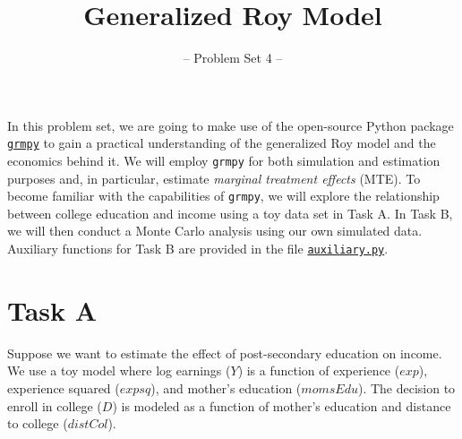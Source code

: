 

\title{Generalized Roy Model}
\subtitle{-- Problem Set 4 --}
\date{}

\maketitle\vspace{-2cm}

In this problem set, we are going to make use of the open-source Python package \href{https://grmpy.readthedocs.io/en/latest/}{\texttt{grmpy}} to gain a practical understanding of the generalized Roy model and the economics behind it. We will employ \texttt{grmpy} for both simulation and estimation purposes and, in particular, estimate \emph{marginal treatment effects} (MTE). To become familiar with the capabilities of {\texttt{grmpy}}, we will explore the relationship between college education and income using a toy data set in Task A. 
In Task B, we will then conduct a Monte Carlo analysis using our own simulated data. Auxiliary functions for Task B are provided in the file \href{https://github.com/HumanCapitalAnalysis/microeconometrics/blob/prset_grmpy/problem-sets/04-generalized-roy-model/sources/auxiliary.py}{\texttt{auxiliary.py}}.

\section*{Task A} 

Suppose we want to estimate the effect of post-secondary education on income. We use a toy model where log earnings ($Y$) is a function of experience ($exp$), experience squared ($expsq$), and mother's education ($momsEdu$). The decision to enroll in college ($D$) is modeled as a function of mother's education and distance to college ($distCol$).


